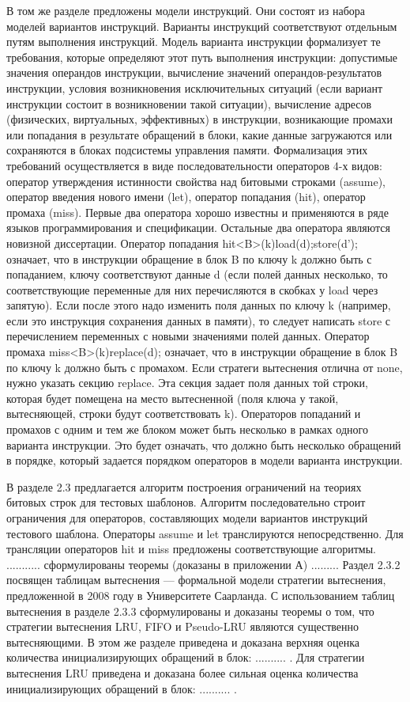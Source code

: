 \documentclass[14pt,autoref,href
,facsimile
]{disser}
\begin{document}
В том же разделе предложены модели инструкций. Они состоят из набора моделей вариантов инструкций. Варианты инструкций соответствуют отдельным путям выполнения инструкций. Модель варианта инструкции формализует те требования, которые определяют этот путь выполнения инструкции: допустимые значения операндов инструкции, вычисление значений операндов-результатов инструкции, условия возникновения исключительных ситуаций (если вариант инструкции состоит в возникновении такой ситуации), вычисление адресов (физических, виртуальных, эффективных) в инструкции, возникающие промахи или попадания в результате обращений в блоки, какие данные загружаются или сохраняются в блоках подсистемы управления памяти. Формализация этих требований осуществляется в виде последовательности операторов 4-х видов: оператор утверждения истинности свойства над битовыми строками (assume), оператор введения нового имени (let), оператор попадания (hit), оператор промаха (miss). Первые два оператора хорошо известны и применяются в ряде языков программирования и спецификации. Остальные два оператора являются новизной диссертации. Оператор попадания hit<B>(k){load(d);store(d');} означает, что в инструкции обращение в блок B по ключу k должно быть с попаданием, ключу соответствуют данные d (если полей данных несколько, то соответствующие переменные для них перечисляются в скобках у load через запятую). Если после этого надо изменить поля данных по ключу k (например, если это инструкция сохранения данных в памяти), то следует написать store с перечислением переменных с новыми значениями полей данных. Оператор промаха miss<B>(k){replace(d);} означает, что в инструкции обращение в блок B по ключу k должно быть с промахом. Если стратеги вытеснения отлична от none, нужно указать секцию replace. Эта секция задает поля данных той строки, которая будет помещена на место вытесненной (поля ключа у такой, вытесняющей, строки будут соответствовать k). Операторов попаданий и промахов с одним и тем же блоком может быть несколько в рамках одного варианта инструкции. Это будет означать, что должно быть несколько обращений в порядке, который задается порядком операторов в модели варианта инструкции. 

В разделе 2.3 предлагается алгоритм построения ограничений на теориях битовых строк для тестовых шаблонов. Алгоритм последовательно строит ограничения для операторов, составляющих модели вариантов инструкций тестового шаблона. Операторы assume и let транслируются непосредственно. Для трансляции операторов hit и miss предложены соответствующие алгоритмы. ........... сформулированы теоремы (доказаны в приложении А) ......... Раздел 2.3.2 посвящен таблицам вытеснения --- формальной модели стратегии вытеснения, предложенной в 2008 году в Университете Саарланда. С использованием таблиц вытеснения в разделе 2.3.3 сформулированы и доказаны теоремы о том, что стратегии вытеснения LRU, FIFO и Pseudo-LRU являются существенно вытесняющими. В этом же разделе приведена и доказана верхняя оценка количества инициализирующих обращений в блок: .......... . Для стратегии вытеснения LRU приведена и доказана более сильная оценка количества инициализирующих обращений в блок: .......... .
\end{document}
